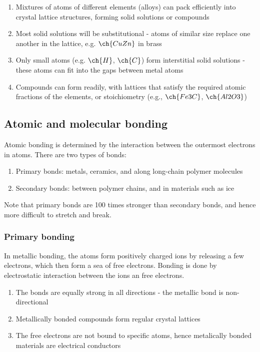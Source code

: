 \documentclass{article}
\begin{document}
\begin{enumerate}
    \item Mixtures of atoms of different elements (alloys) can pack efficiently into crystal lattice structures, forming solid solutions or compounds
    \item Most solid solutions will be substitutional - atoms of similar size replace one another in the lattice, e.g. $\ch{CuZn}$ in brass
    \item Only small atoms (e.g. $\ch{H}$, $\ch{C}$) form interstitial solid solutions - these atoms can fit into the gaps between metal atoms
    \item Compounds can form readily, with lattices that satisfy the required atomic fractions of the elements, or stoichiometry (e.g., $\ch{Fe3C}$, $\ch{Al2O3}$)
\end{enumerate}

\newpage

\subsection{Atomic and molecular bonding}

Atomic bonding is determined by the interaction between the outermost electrons in atoms. There are two types of bonds:

\begin{enumerate}
    \item Primary bonds: metals, ceramics, and along long-chain polymer molecules
    \item Secondary bonds: between polymer chains, and in materials such as ice
\end{enumerate}

Note that primary bonds are 100 times stronger than secondary bonds, and hence more difficult to stretch and break.

\subsubsection{Primary bonding}

\begin{definition}
    In metallic bonding, the atoms form positively charged ions by releasing a few electrons, which then form a sea of free electrons. Bonding is done by electrostatic interaction between the ions an free electrons.

    \begin{enumerate}
        \item The bonds are equally strong in all directions - the metallic bond is non-directional
        \item Metallically bonded compounds form regular crystal lattices
        \item The free electrons are not bound to specific atoms, hence metalically bonded materials are electrical conductors
    \end{enumerate}
\end{definition}
\end{document}
